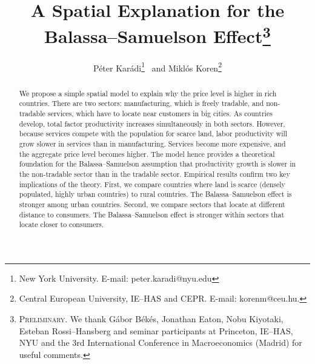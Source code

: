 \documentclass[12pt]{article}
\begin{document}
\title{A Spatial Explanation for the Balassa--Samuelson Effect\thanks{\textsc{Preliminary.} We thank G\'abor B\'ek\'es, Jonathan Eaton, Nobu Kiyotaki, Esteban Rossi--Hansberg and seminar participants at Princeton, IE--HAS, NYU and the 3rd International Conference in Macroeconomics (Madrid) for useful comments.}}
\author{P\'eter Kar\'adi\thanks{New York University. E-mail: peter.karadi@nyu.edu}~ and Mikl\'os Koren\thanks{Central European University, IE--HAS and CEPR. E-mail: korenm@ceu.hu.}}
\maketitle

\begin{abstract}
We propose a simple spatial model to explain why the price level is higher in rich countries. There are two sectors: manufacturing, which is freely tradable, and non-tradable services, which have to locate near customers in big cities. As countries develop, total factor productivity increases simultaneously in both sectors. However, because services compete with the population for scarce land, labor productivity will grow slower in services than in manufacturing. Services become more expensive, and the aggregate price level becomes higher. The model hence provides a theoretical foundation for the Balassa--Samuelson assumption that productivity growth is slower in the non-tradable sector than in the tradable sector. Empirical results confirm two key implications of the theory. First, we compare countries where land is scarce (densely populated, highly urban countries) to rural countries. The Balassa--Samuelson effect is stronger among urban countries. Second, we compare sectors that locate at different distance to consumers. The Balassa--Samuelson effect is stronger within sectors that locate closer to consumers.
\end{abstract}
\end{document}
